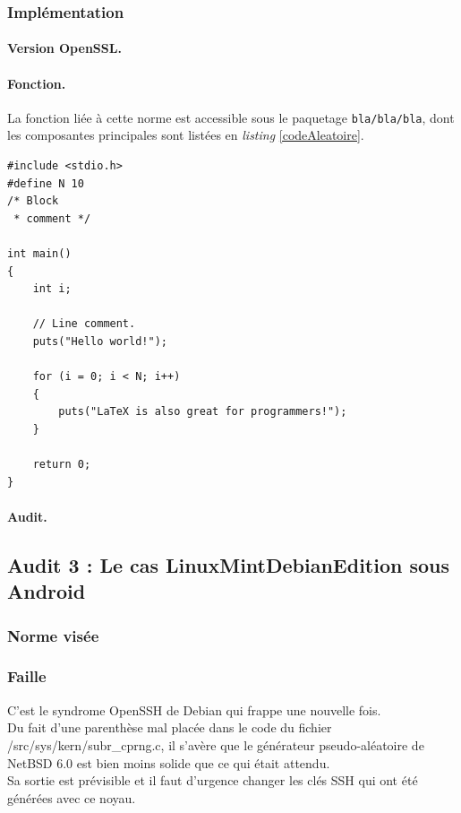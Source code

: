 	
	\subsubsection{Implémentation}
		
		\paragraph{Version OpenSSL.\\}
		
		\paragraph{Fonction.\\}
		La fonction liée à cette norme est accessible sous le paquetage \texttt{bla/bla/bla}, dont les composantes principales sont listées en \textit{listing} \ref{codeAleatoire}.
		
		
		\begin{lstlisting}[style=customc,caption=codeAleatoire.c, label=codeAleatoire]
#include <stdio.h>
#define N 10
/* Block
 * comment */
 
int main()
{
    int i;
 
    // Line comment.
    puts("Hello world!");
 
    for (i = 0; i < N; i++)
    {
        puts("LaTeX is also great for programmers!");
    }
 
    return 0;
}
		\end{lstlisting}
		
		
		
		\paragraph{Audit.\\}

	\subsection{Audit 3 : Le cas LinuxMintDebianEdition sous Android}
	\subsubsection{Norme visée}
	\subsubsection{Faille}
	
	C'est le syndrome OpenSSH de Debian qui frappe une nouvelle fois.\\
	Du fait d'une parenthèse mal placée dans le code du fichier 
	/src/sys/kern/subr\_cprng.c, il s'avère que le générateur pseudo-aléatoire 
	de NetBSD 6.0 est bien moins solide que ce qui était attendu.\\
	Sa sortie est prévisible et il faut d'urgence changer les clés SSH qui ont été générées avec ce noyau.\\
	
